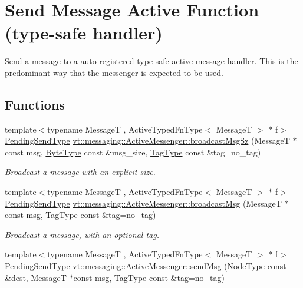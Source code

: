\hypertarget{group__typesafehan}{}\section{Send Message Active Function (type-\/safe handler)}
\label{group__typesafehan}


Send a message to a auto-\/registered type-\/safe active message handler. This is the predominant way that the messenger is expected to be used.  


\subsection*{Functions}
\begin{DoxyCompactItemize}
\item 
{\footnotesize template$<$typename MessageT , Active\+Typed\+Fn\+Type$<$ Message\+T $>$ $\ast$ f$>$ }\\\hyperlink{structvt_1_1messaging_1_1_active_messenger_a3626a6ca76d8ad4ec7c3b47a2c70d3a8}{Pending\+Send\+Type} \hyperlink{group__typesafehan_ga85e49835912df14e08378b08378e1513}{vt\+::messaging\+::\+Active\+Messenger\+::broadcast\+Msg\+Sz} (MessageT $\ast$const msg, \hyperlink{namespacevt_aab8d55968084610ce3b17057981e9300}{Byte\+Type} const \&msg\+\_\+size, \hyperlink{namespacevt_a84ab281dae04a52a4b243d6bf62d0e52}{Tag\+Type} const \&tag=no\+\_\+tag)
\begin{DoxyCompactList}\small\item\em Broadcast a message with an explicit size. \end{DoxyCompactList}\item 
{\footnotesize template$<$typename MessageT , Active\+Typed\+Fn\+Type$<$ Message\+T $>$ $\ast$ f$>$ }\\\hyperlink{structvt_1_1messaging_1_1_active_messenger_a3626a6ca76d8ad4ec7c3b47a2c70d3a8}{Pending\+Send\+Type} \hyperlink{group__typesafehan_gadad0627a27bd7be174369cf14296afad}{vt\+::messaging\+::\+Active\+Messenger\+::broadcast\+Msg} (MessageT $\ast$const msg, \hyperlink{namespacevt_a84ab281dae04a52a4b243d6bf62d0e52}{Tag\+Type} const \&tag=no\+\_\+tag)
\begin{DoxyCompactList}\small\item\em Broadcast a message, with an optional tag. \end{DoxyCompactList}\item 
{\footnotesize template$<$typename MessageT , Active\+Typed\+Fn\+Type$<$ Message\+T $>$ $\ast$ f$>$ }\\\hyperlink{structvt_1_1messaging_1_1_active_messenger_a3626a6ca76d8ad4ec7c3b47a2c70d3a8}{Pending\+Send\+Type} \hyperlink{group__typesafehan_ga1925bf9b7fd299f45a7bdcf3239fa262}{vt\+::messaging\+::\+Active\+Messenger\+::send\+Msg} (\hyperlink{namespacevt_a866da9d0efc19c0a1ce79e9e492f47e2}{Node\+Type} const \&dest, MessageT $\ast$const msg, \hyperlink{namespacevt_a84ab281dae04a52a4b243d6bf62d0e52}{Tag\+Type} const \&tag=no\+\_\+tag)

\end{DoxyCompactItemize}
